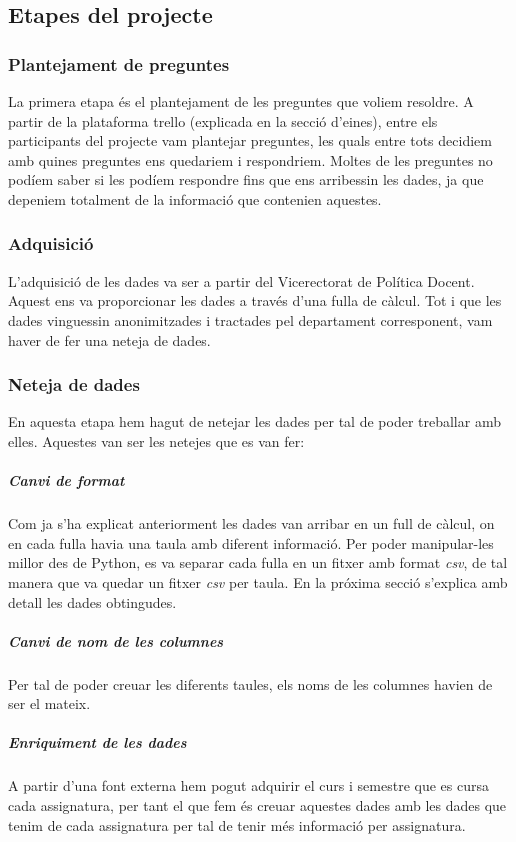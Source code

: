 \documentclass[12pt,a4paper,catalan]{article}
\begin{document}
\subsection{Etapes del projecte}

\subsubsection{Plantejament de preguntes}
La primera etapa és el plantejament de les preguntes que voliem resoldre. A partir de la plataforma trello (explicada en la secció d'eines), entre els participants del projecte vam plantejar preguntes, les quals entre tots decidiem amb quines preguntes ens quedariem i respondriem. Moltes de les preguntes no podíem saber si les podíem respondre fins que ens arribessin les dades, ja que depeniem totalment de la informació que contenien aquestes.

\subsubsection{Adquisició}
L'adquisició de les dades va ser a partir del Vicerectorat de Política Docent. Aquest ens va proporcionar les dades a través d'una fulla de càlcul. Tot i que les dades vinguessin anonimitzades i tractades pel departament corresponent, vam haver de fer una neteja de dades.

\subsubsection{Neteja de dades}
En aquesta etapa hem hagut de netejar les dades per tal de poder treballar amb elles. Aquestes van ser les netejes que es van fer:

\subparagraph{Canvi de format}
Com ja s'ha explicat anteriorment les dades van arribar en un full de càlcul, on en cada fulla havia una taula amb diferent informació. Per poder manipular-les millor des de Python, es va separar cada fulla en un fitxer amb format \textit{csv}, de tal manera que va quedar un fitxer \textit{csv} per taula. En la próxima secció s'explica amb detall les dades obtingudes.

\subparagraph{Canvi de nom de les columnes}
Per tal de poder creuar les diferents taules, els noms de les columnes havien de ser el mateix.

\subparagraph{Enriquiment de les dades}
A partir d'una font externa hem pogut adquirir el curs i semestre que es cursa cada assignatura, per tant el que fem és creuar aquestes dades amb les dades que tenim de cada assignatura per tal de tenir més informació per assignatura.
\end{document}
